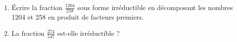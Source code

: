 
\begin{enumerate}
\item Écrire la fraction $\frac{1204}{258}$ sous forme irréductible en décomposant les nombres 1204 et 258 en produit de facteurs premiers.
\item La fraction $\frac{274}{547}$ est-elle irréductible ?
\end{enumerate}